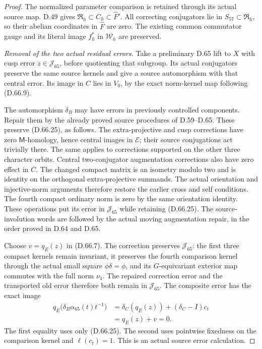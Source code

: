 \begin{proof}
The normalized parameter comparison is retained
through its actual source map. D.49 gives
\(\mathfrak R_h\subset C_h\subset\widehat F'\).
All correcting conjugators lie in
\(S_{57}\subset\mathfrak R_h\), so their
abelian coordinates in \(\widehat F\) are zero.
The existing common commutator gauge and its
literal image \(f_h^*\) in \(\mathcal W_h\)
are preserved.

\emph{Removal of the two actual residual errors.}
Take a preliminary D.65 lift to \(X\)
with cusp error \(z\in\mathcal J_{65}\),
before quotienting that subgroup. Its
actual conjugators preserve the same source
kernels and give a source automorphism
with that central error. Its image in
\(C\) lies in \(V_0\), by the exact
norm-kernel map following (D.66.9).

The automorphism \(\delta_B\) may have
errors in previously controlled components.
Repair them by the already proved source
procedures of D.59--D.65. These preserve
(D.66.25), as follows. The extra-projective
and cusp corrections have zero
\(\mathsf M\)-homology, hence central
images in \(\mathscr E\); their source
conjugations act trivially there. The
same applies to corrections supported on
the other three character orbits.
Central two-conjugator augmentation
corrections also have zero effect in
\(C\). The changed compact matrix is
an isometry modulo two and is identity
on the orthogonal extra-projective
summands. The actual orientation and
injective-norm arguments therefore restore
the earlier cross and self conditions.
The fourth compact ordinary norm is zero
by the same orientation identity.
These operations put its error in
\(\mathcal J_{65}\) while retaining
(D.66.25). The source-involution words
are followed by the actual moving
augmentation repair, in the order
proved in D.64 and D.65.

Choose \(v=q_E(z)\) in (D.66.7).
The correction preserves \(\mathcal J_{65}\):
the first three compact kernels remain invariant,
it preserves the fourth comparison kernel through
the actual small square \(\phi\delta=\phi\),
and its \(G\)-equivariant exterior map commutes
with the full norm \(\nu_4\).
The repaired correction error and the transported
old error therefore both remain in
\(\mathcal J_{65}\).
The composite error has the exact image
\[
 \begin{aligned}
 q_E\bigl(\delta_B\alpha_{65}(t)t^{-1}\bigr)
    &=\delta_C(q_E(z))+(\delta_C-I)c_t\\
    &=q_E(z)+v=0.
 \end{aligned}
 \tag{D.66.26}
\]
The first equality uses only (D.66.25).
The second uses pointwise fixedness on
the comparison kernel and
\(\ell(c_t)=1\). This is an actual
source error calculation.


\end{proof}
